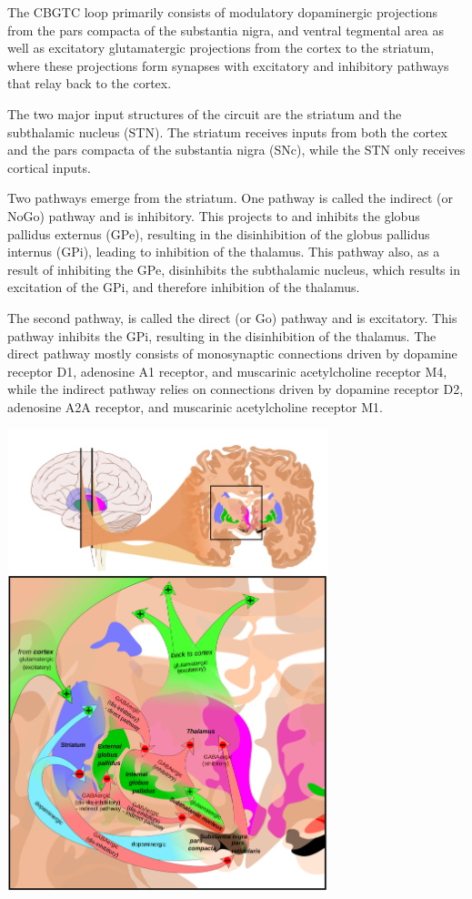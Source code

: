 The CBGTC loop primarily consists of modulatory dopaminergic projections
from the pars compacta of the substantia nigra, and ventral tegmental
area as well as excitatory glutamatergic projections from the cortex to
the striatum, where these projections form synapses with excitatory and
inhibitory pathways that relay back to the cortex.

The two major input structures of the circuit are the striatum and the
subthalamic nucleus (STN). The striatum receives inputs from both the
cortex and the pars compacta of the substantia nigra (SNc), while the
STN only receives cortical inputs.

Two pathways emerge from the striatum. One pathway is called the
indirect (or NoGo) pathway and is inhibitory. This projects to and
inhibits the globus pallidus externus (GPe), resulting in the
disinhibition of the globus pallidus internus (GPi), leading to
inhibition of the thalamus. This pathway also, as a result of inhibiting
the GPe, disinhibits the subthalamic nucleus, which results in
excitation of the GPi, and therefore inhibition of the thalamus.

The second pathway, is called the direct (or Go) pathway and is
excitatory. This pathway inhibits the GPi, resulting in the
disinhibition of the thalamus. The direct pathway mostly consists of
monosynaptic connections driven by dopamine receptor D1, adenosine A1
receptor, and muscarinic acetylcholine receptor M4, while the indirect
pathway relies on connections driven by dopamine receptor D2, adenosine
A2A receptor, and muscarinic acetylcholine receptor M1.

\protect\hypertarget{fig:basalcircuits}{}{}
\includegraphics[width=0.7\textwidth,height=\textheight]{figures/motor/Basal_ganglia_circuits.svg}


